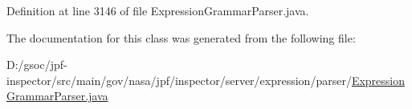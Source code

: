 Definition at line 3146 of file Expression\+Grammar\+Parser.\+java.



The documentation for this class was generated from the following file\+:\begin{DoxyCompactItemize}
\item 
D\+:/gsoc/jpf-\/inspector/src/main/gov/nasa/jpf/inspector/server/expression/parser/\hyperlink{_expression_grammar_parser_8java}{Expression\+Grammar\+Parser.\+java}\end{DoxyCompactItemize}
